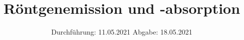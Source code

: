 

\subject{V 602}
\title{Röntgenemission und -absorption}
\date{%
  Durchführung: 11.05.2021
  \hspace{3em}
  Abgabe: 18.05.2021
}



\maketitle
\thispagestyle{empty}
\tableofcontents
\newpage







\printbibliography{}


